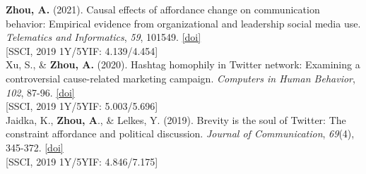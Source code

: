 \documentclass[12pt, letterpaper]{article}
\newcommand{\doi}[1]{\href{#1}{{[doi]}}}
\newcommand{\years}[1]{\marginnote{\normalsize #1}}
\begin{document}
  \years{[4]} \textbf{Zhou, A.} (2021). Causal effects of affordance change on communication behavior: Empirical evidence from organizational and leadership social media use. \textit{Telematics and Informatics}, \textit{59}, 101549. \doi{https://doi.org/10.1016/j.tele.2020.101549}\\
  \years{} {[SSCI, 2019 1Y/5YIF: 4.139/4.454]}\\
  \years{[3]} Xu, S., \& \textbf{Zhou, A.} (2020). Hashtag homophily in Twitter network: Examining a controversial cause-related marketing campaign. \textit{Computers in Human Behavior}, \textit{102}, 87-96. \doi{https://doi.org/10.1016/j.chb.2019.08.006}\\
  \years{} {[SSCI, 2019 1Y/5YIF: 5.003/5.696]}\\
  \years{[2]} Jaidka, K., \textbf{Zhou, A}., \& Lelkes, Y. (2019). Brevity is the soul of Twitter: The constraint affordance and political discussion. \textit{Journal of Communication}, \textit{69}(4), 345-372. \doi{https://doi.org/10.1093/joc/jqz023}\\
  \years{} {[SSCI, 2019 1Y/5YIF: 4.846/7.175]}\\
\end{document}
